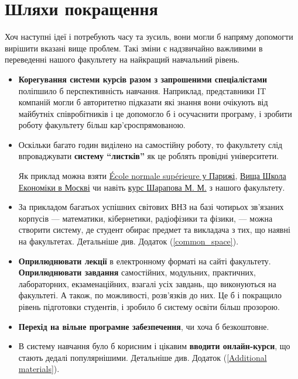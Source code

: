 \documentclass[14pt, a4paper]{extarticle}  %
\begin{document}
\newpage
\section{Шляхи покращення}

Хоч наступні ідеї і потребують часу та зусиль, вони могли б напряму допомогти  вирішити вказані вище проблем. Такі зміни є надзвичайно важливими в переведенні нашого факультету на найкращий навчальний рівень.    

\begin{itemize}
    \item  \textbf{Корегування системи курсів разом з  запрошеними спеціалістами} поліпшило б перспективність навчання. Наприклад, представники IT компаній могли б авторитетно підказати які знання вони очікують від майбутніх співробітників і це допомогло б і осучаснити програму, і зробити роботу факультету більш кар'єроспрямо\-ваною.
    
    \item Оскільки багато годин виділено на самостійну роботу, то факультету слід впроваджувати \textbf{систему ``листків''} як це роблять провідні університети. 
    
    Як приклад можна взяти \href{https://www.math.ens.fr/enseignement/fiche_cours.html?cours=201}{École normale supérieure у Парижі}, \href{https://math.hse.ru/bac3/4-pma-13}{Вища Школа Економіки в Москві} чи навіть \href{http://teorver.pp.ua/ukr/ukr.php?templ=tv1}{курс Шарапова М. М.} з нашого факультету.  
    
    \item За прикладом багатьох успішних світових ВНЗ на базі чотирьох зв'язаних корпусів --- математики, кібернетики, радіофізики та фізики, --- можна створити систему, де студент обирає предмет та викладача з тих, що наявні на факультетах. Детальніше див. Додаток (\ref{common_space}). %
    
    \item  \textbf{Оприлюднювати лекції} в електронному форматі на сайті факультету.
     \textbf{Оприлюднювати завдання} самостійних, модульних, практичних, лабораторних, екзаменаційних, взагалі усіх завдань, що виконуються на факультеті. А також, по можливості, розв'язків до них. Це б і покращило рівень підготовки студентів, і зробило б систему освіти більш прозорою. 
    
    \item \textbf{Перехід на вільне програмне забезпечення}, чи хоча б безкоштовне.
    
    \item В систему навчання було б корисним і цікавим \textbf{вводити онлайн-курси}, що стають дедалі популярнішими. Детальніше див. Додаток (\ref{Additional materials}).
\end{itemize}
\end{document}
